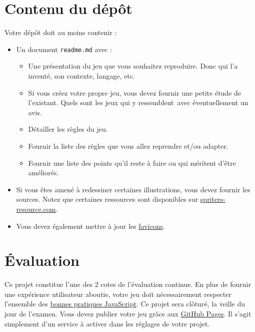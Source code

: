 \clearpage
\section{Contenu du dépôt}
\label{La documentation}

Votre dépôt doit au moins contenir :
\begin{itemize}
  \item Un document \verb!readme.md! avec :
        \begin{itemize}
          \item Une présentation du jeu que vous souhaitez reproduire. Donc qui l'a inventé, son contexte, langage, etc.
          \item Si vous créez votre propre jeu, vous devez fournir une petite étude de l'existant. Quels sont les jeux qui y ressemblent~avec éventuellement un avis.
          \item Détailler les règles du jeu.
          \item Fournir la liste des règles que vous allez reprendre et/ou adapter.
          \item Fournir une liste des points qu'il reste à faire ou qui méritent d'être améliorés.
        \end{itemize}
  \item Si vous êtes amené à redessiner certaines illustrations, vous devez fournir les sources. Notez que certaines ressources sont disponibles sur \href{https://www.spriters-resource.com}{spriters-resource.com}.
  \item Vous devez également mettre à jour les \href{https://realfavicongenerator.net}{favicons}.
\end{itemize}

\section{Évaluation}

Ce projet constitue l'une des 2 cotes de l'évaluation continue. En plus de fournir une expérience utilisateur aboutie, votre jeu doit nécessairement respecter l'ensemble des \href{https://github.com/hepl-dcc/dcc-guidelines}{bonnes pratiques JavaScript}.
Ce projet sera clôturé, la veille du jour de l'examen. Vous devez publier votre jeu grâce aux \href{https://docs.github.com/en/pages/getting-started-with-github-pages/configuring-a-publishing-source-for-your-github-pages-site}{GitHub Pages}. Il s'agit simplement d'un service à activer dans les réglages de votre projet.




